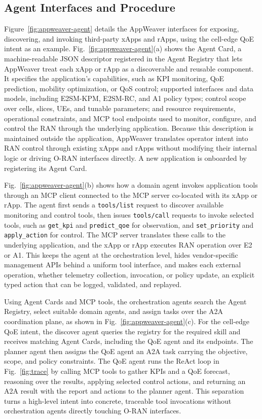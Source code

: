 \documentclass[conference]{IEEEtran}
\begin{document}
\subsection{Agent Interfaces and Procedure}
Figure~\ref{fig:appweaver-agent} details the AppWeaver interfaces for exposing, discovering, and invoking third-party xApps and rApps, using the cell-edge QoE intent as an example. Fig.~\ref{fig:appweaver-agent}(a) shows the Agent Card, a machine-readable JSON descriptor registered in the Agent Registry that lets AppWeaver treat each xApp or rApp as a discoverable and reusable component. It specifies the application's capabilities, such as KPI monitoring, QoE prediction, mobility optimization, or QoS control; supported interfaces and data models, including E2SM-KPM, E2SM-RC, and A1 policy types; control scope over cells, slices, UEs, and tunable parameters; and resource requirements, operational constraints, and MCP tool endpoints used to monitor, configure, and control the RAN through the underlying application. Because this description is maintained outside the application, AppWeaver translates operator intent into RAN control through existing xApps and rApps without modifying their internal logic or driving O-RAN interfaces directly. A new application is onboarded by registering its Agent Card.

Fig.~\ref{fig:appweaver-agent}(b) shows how a domain agent invokes application tools through an MCP client connected to the MCP server co-located with its xApp or rApp. The agent first sends a \texttt{tools/list} request to discover available monitoring and control tools, then issues \texttt{tools/call} requests to invoke selected tools, such as \texttt{get\_kpi} and \texttt{predict\_qoe} for observation, and \texttt{set\_priority} and \texttt{apply\_action} for control. The MCP server translates these calls to the underlying application, and the xApp or rApp executes RAN operation over E2 or A1. This keeps the agent at the orchestration level, hides vendor-specific management APIs behind a uniform tool interface, and makes each external operation, whether telemetry collection, invocation, or policy update, an explicit typed action that can be logged, validated, and replayed.

Using Agent Cards and MCP tools, the orchestration agents search the Agent Registry, select suitable domain agents, and assign tasks over the A2A coordination plane, as shown in Fig.~\ref{fig:appweaver-agent}(c). For the cell-edge QoE intent, the discover agent queries the registry for the required skill and receives matching Agent Cards, including the QoE agent and its endpoints. The planner agent then assigns the QoE agent an A2A task carrying the objective, scope, and policy constraints. The QoE agent runs the ReAct loop in Fig.~\ref{fig:trace} by calling MCP tools to gather KPIs and a QoE forecast, reasoning over the results, applying selected control actions, and returning an A2A result with the report and actions to the planner agent. This separation turns a high-level intent into concrete, traceable tool invocations without orchestration agents directly touching O-RAN interfaces.
\end{document}

